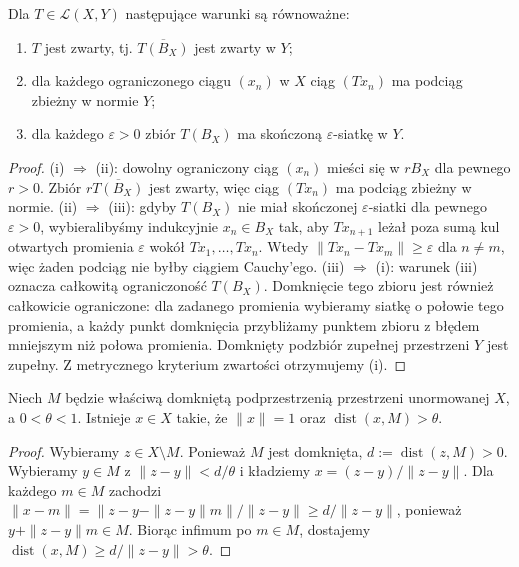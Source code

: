 \begin{twierdzenie}
\label{thm:compact-criteria29}
Dla $T\in\mathcal L(X,Y)$ następujące warunki są równoważne:
\begin{enumerate}[label=\textup{(\roman*)}]
\item $T$ jest zwarty, tj. $\overline{T(B_X)}$ jest zwarty w $Y$;
\item dla każdego ograniczonego ciągu $(x_n)$ w $X$ ciąg $(Tx_n)$
      ma podciąg zbieżny w normie $Y$;
\item dla każdego $\varepsilon>0$ zbiór $T(B_X)$ ma skończoną
      $\varepsilon$-siatkę w $Y$.
\end{enumerate}
\end{twierdzenie}
\begin{proof}
(i) $\Rightarrow$ (ii): dowolny ograniczony ciąg $(x_n)$
mieści się w $rB_X$ dla pewnego $r>0$. Zbiór
$r\overline{T(B_X)}$ jest zwarty, więc ciąg $(Tx_n)$ ma
podciąg zbieżny w normie.
(ii) $\Rightarrow$ (iii): gdyby $T(B_X)$ nie miał skończonej
$\varepsilon$-siatki dla pewnego $\varepsilon>0$, wybieralibyśmy
indukcyjnie $x_n\in B_X$ tak, aby $Tx_{n+1}$ leżał poza sumą
kul otwartych promienia $\varepsilon$ wokół $Tx_1,\ldots,Tx_n$.
Wtedy $\|Tx_n-Tx_m\|\ge\varepsilon$ dla $n\ne m$,
więc żaden podciąg nie byłby ciągiem Cauchy'ego.
(iii) $\Rightarrow$ (i): warunek (iii) oznacza całkowitą
ograniczoność $T(B_X)$. Domknięcie tego zbioru jest również
całkowicie ograniczone: dla zadanego promienia wybieramy
siatkę o połowie tego promienia, a każdy punkt domknięcia
przybliżamy punktem zbioru z błędem mniejszym niż połowa
promienia. Domknięty podzbiór zupełnej przestrzeni $Y$ jest
zupełny. Z metrycznego kryterium zwartości otrzymujemy (i).
\end{proof}

\begin{lemat}
\label{lem:riesz29}
Niech $M$ będzie właściwą domkniętą podprzestrzenią przestrzeni
unormowanej $X$, a $0<\theta<1$. Istnieje $x\in X$ takie, że
$\|x\|=1$ oraz $\operatorname{dist}(x,M)>\theta$.
\end{lemat}
\begin{proof}
Wybieramy $z\in X\setminus M$. Ponieważ $M$ jest domknięta,
$d:=\operatorname{dist}(z,M)>0$. Wybieramy $y\in M$ z
$\|z-y\|<d/\theta$ i kładziemy $x=(z-y)/\|z-y\|$.
Dla każdego $m\in M$ zachodzi
$\|x-m\|=\|z-y-\|z-y\|m\|/\|z-y\|\ge d/\|z-y\|$,
ponieważ $y+\|z-y\|m\in M$. Biorąc infimum po $m\in M$,
dostajemy $\operatorname{dist}(x,M)\ge d/\|z-y\|>\theta$.
\end{proof}

